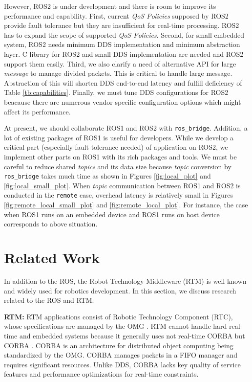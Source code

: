 \documentclass{sig-alternate-05-2015}
\begin{document}
However, ROS2 is under development and there is room to improve its performance and capability.
First, current \emph{QoS Policies} supposed by ROS2 provide fault tolerance but they are insufficient for real-time processing.
ROS2 has to expand the scope of supported \emph{QoS Policies}.
Second, for small embedded system, ROS2 needs minimum DDS implementation and minimum abstraction layer.
C library for ROS2 and small DDS implementation are needed and ROS2 support them easily.
Third, we also clarify a need of alternative API for large \emph{message} to manage divided packets.
This is critical to handle large message.
Abstraction of this will shorten DDS end-to-end latency and fulfill deficiency of Table \ref{tb:capabilities}.
Finally, we must tune DDS configurations for ROS2 beacause there are numerous vendor specific configuration options which might affect its performance.

At present, we should collaborate ROS1 and ROS2 with \texttt{ros\_bridge}.
Addition, a lot of existing packages of ROS1 is useful for developers.
While we develop a critical part (especially fault tolerance needed) of application on ROS2, we implement other parts on ROS1 with its rich packages and tools.
We must be careful to reduce shared \emph{topics} and its data size because \emph{topic} conversion by \texttt{ros\_bridge} takes much time as shown in Figures \ref{fig:local_plot} and \ref{fig:local_small_plot}.
When \emph{topic} communication between ROS1 and ROS2 is conducted in the \texttt{remote} case, overhead latency is relatively small in Figures \ref{fig:remote_local_small_plot} and \ref{fig:remote_local_plot}.
For instance, the case when ROS1 runs on an embedded device and ROS1 runs on host device corresponds to above situation.

\section{Related Work}
\label{sec:orgheadline3}

In addition to the ROS, the Robot Technology Middleware (RTM) \cite{ando2005rt} is well known and widely used for robotics development. 
In this section, we discuss research related to the ROS and RTM.

\textbf{RTM:} 
RTM applications consist of Robotic Technology Component (RTC), whose specifications are managed by the OMG \cite{omg}. 
RTM cannot handle hard real-time and embedded systems because it generally uses not real-time CORBA \cite{schmidt1998design} but CORBA \cite{vinoski1997corba} \cite{corba3.3}.
CORBA is an architecture for distributed object computing being standardized by the OMG.
CORBA manages packets in a FIFO manager and requires significant resources. 
Unlike DDS, CORBA lacks key quality of service features and performance optimizations for real-time constraints.
\end{document}
